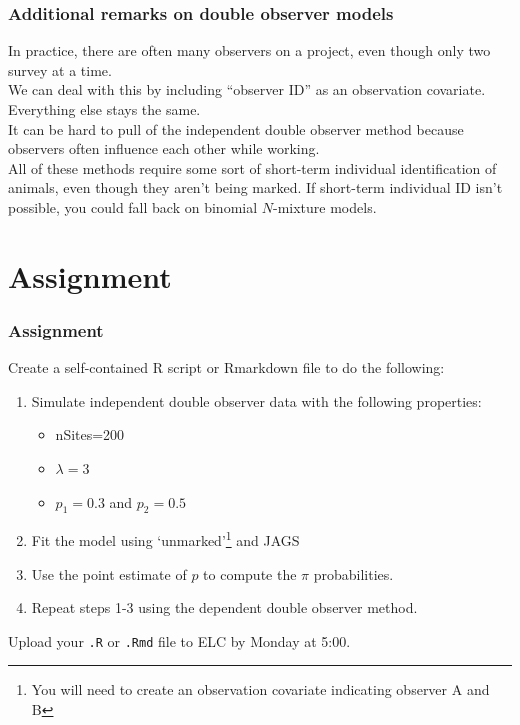 \documentclass[color=usenames,dvipsnames]{beamer}\usepackage[]{graphicx}\usepackage[]{color}
\begin{document}
\begin{frame}
  \frametitle{Additional remarks on double observer models}
  In practice, there are often many observers on a project, even
  though only two survey at a time. \\
  \pause
  \vfill
  We can deal with this by including ``observer ID'' as an observation
  covariate. Everything else stays the same. \\
  \pause
  \vfill
  It can be hard to pull of the independent double observer method
  because observers often influence each other while working. \\
  \pause
  \vfill
  All of these methods require some sort of \alert{short-term}
  individual identification of animals, even though they aren't being
  marked.
  \pause
  \vfill
  If short-term individual ID isn't possible, you could fall
  back on binomial $N$-mixture models.
\end{frame}




\section{Assignment}




\begin{frame}[fragile]
  \frametitle{Assignment}
  \footnotesize
  Create a self-contained R script or Rmarkdown file
  to do the following:
  \vfill
  \begin{enumerate}
    \footnotesize
    \item Simulate \alert{independent} double observer data with the following
      properties:
      \begin{itemize}
        \item nSites=200
        \item $\lambda=3$
        \item $p_1=0.3$ and $p_2=0.5$
      \end{itemize}
    \item Fit the model using `unmarked'\footnote{\scriptsize You will
        need to create an observation covariate indicating observer A
        and B} and JAGS
    \item Use the point estimate of $p$ to compute the $\pi$ probabilities.
    \item Repeat steps 1-3 using the \alert{dependent} double observer
      method. 
  \end{enumerate}
  \vfill
  Upload your {\tt .R} or {\tt .Rmd} file to ELC by Monday at 5:00. 
\end{frame}
\end{document}
